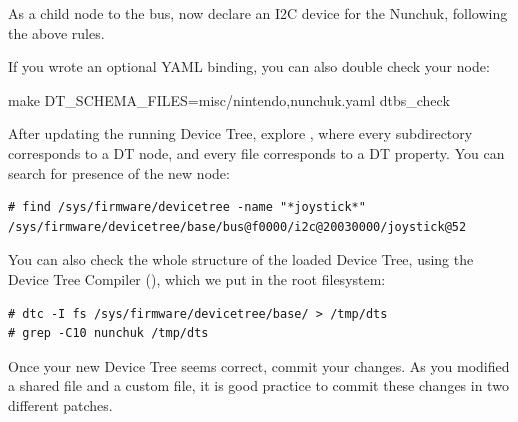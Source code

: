 As a child node to the  bus, now declare an I2C device
for the Nunchuk, following the above rules.

If you wrote an optional YAML binding, you can also double check your
node:
\begin{bashinput}
make DT_SCHEMA_FILES=misc/nintendo,nunchuk.yaml dtbs_check
\end{bashinput}

After updating the running Device Tree, explore
, where every subdirectory corresponds to
a DT node, and every file corresponds to a DT property. You can search
for presence of the new  node:

{\small
\begin{verbatim}
# find /sys/firmware/devicetree -name "*joystick*"
/sys/firmware/devicetree/base/bus@f0000/i2c@20030000/joystick@52
\end{verbatim}
}

You can also check the whole structure of the loaded Device Tree, using
the Device Tree Compiler (), which we put in the root
filesystem:
\begin{verbatim}
# dtc -I fs /sys/firmware/devicetree/base/ > /tmp/dts
# grep -C10 nunchuk /tmp/dts
\end{verbatim}

Once your new Device Tree seems correct, commit your changes. As you
modified a shared file and a custom file, it is good practice to commit
these changes in two different patches.
